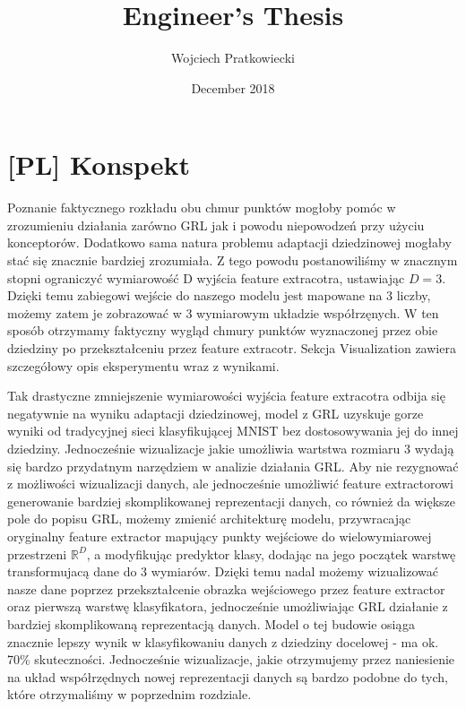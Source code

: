 \documentclass{article}
\title{Engineer's Thesis}
\author{Wojciech Pratkowiecki}
\date{December 2018}
\begin{document}
\maketitle

\section{[PL] Konspekt}
Poznanie faktycznego rozkładu obu chmur punktów mogłoby pomóc w zrozumieniu działania zarówno GRL jak i powodu niepowodzeń przy użyciu konceptorów. Dodatkowo sama natura problemu adaptacji dziedzinowej mogłaby stać się znacznie bardziej zrozumiała. Z tego powodu postanowiliśmy w znacznym stopni ograniczyć wymiarowość D wyjścia feature extracotra, ustawiając $D=3$. Dzięki temu zabiegowi wejście do naszego modelu jest mapowane na 3 liczby, możemy zatem je zobrazować w 3 wymiarowym układzie współrzęnych. W ten sposób otrzymamy faktyczny wygląd chmury punktów wyznaczonej przez obie dziedziny po przekształceniu przez feature extracotr. Sekcja Visualization zawiera szczegółowy opis eksperymentu wraz z wynikami.
\par
Tak drastyczne zmniejszenie wymiarowości wyjścia feature extracotra odbija się negatywnie na wyniku adaptacji dziedzinowej, model z GRL uzyskuje gorze wyniki od tradycyjnej sieci klasyfikującej MNIST bez dostosowywania jej do innej dziedziny. Jednocześnie wizualizacje jakie umożliwia wartstwa rozmiaru 3 wydają się bardzo przydatnym narzędziem w analizie działania GRL. Aby nie rezygnować z możliwości wizualizacji danych, ale jednocześnie umożliwić feature extractorowi generowanie bardziej skomplikowanej reprezentacji danych, co również da większe pole do popisu GRL, możemy zmienić architekturę modelu, przywracając oryginalny feature extractor mapujący punkty wejściowe do wielowymiarowej przestrzeni $\mathbb{R}^{D}$, a modyfikując predyktor klasy, dodając na jego początek warstwę transformujacą dane do 3 wymiarów. Dzięki temu nadal możemy wizualizować nasze dane poprzez przekształcenie obrazka wejściowego przez feature extractor oraz pierwszą warstwę klasyfikatora, jednocześnie umożliwiając GRL działanie z bardziej skomplikowaną reprezentacją danych. Model o tej budowie osiąga znacznie lepszy wynik w klasyfikowaniu danych z dziedziny docelowej - ma ok. 70\% skuteczności. Jednocześnie wizualizacje, jakie otrzymujemy przez naniesienie na układ współrzędnych nowej reprezentacji danych są bardzo podobne do tych, które otrzymaliśmy w poprzednim rozdziale.
\par
\end{document}
